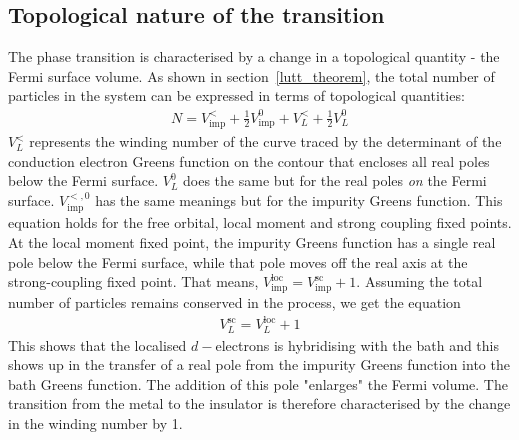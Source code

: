 \documentclass[10pt]{report}
\numberwithin{equation}{section}
\begin{document}
\subsection{Topological nature of the transition}
The phase transition is characterised by a change in a topological quantity - the Fermi surface volume. As shown in section~\ref{lutt_theorem}, the total number of particles in the system can be expressed in terms of topological quantities:
\begin{equation}\begin{aligned}
	N = V_\text{imp}^< + \frac{1}{2}V_\text{imp}^0 + V_L^< + \frac{1}{2}V_L^0
\end{aligned}\end{equation}
\(V_L^<\) represents the winding number of the curve traced by the determinant of the conduction electron Greens function on the contour that encloses all real poles below the Fermi surface. \(V_L^0\) does the same but for the real poles {\it on} the Fermi surface. \(V_\text{imp}^{<,0}\) has the same meanings but for the impurity Greens function. This equation holds for the free orbital, local moment and strong coupling fixed points. At the local moment fixed point, the impurity Greens function has a single real pole below the Fermi surface, while that pole moves off the real axis at the strong-coupling fixed point. That means, \(V_\text{imp}^\text{loc} = V_\text{imp}^\text{sc} + 1\). Assuming the total number of particles remains conserved in the process, we get the equation
\begin{equation}\begin{aligned}
	V_L^\text{sc} = V_L^\text{loc} + 1
\end{aligned}\end{equation}
This shows that the localised \(d-\)electrons is hybridising with the bath and this shows up in the transfer of a real pole from the impurity Greens function into the bath Greens function. The addition of this pole "enlarges" the Fermi volume. The transition from the metal to the insulator is therefore characterised by the change in the winding number by 1.
\end{document}
